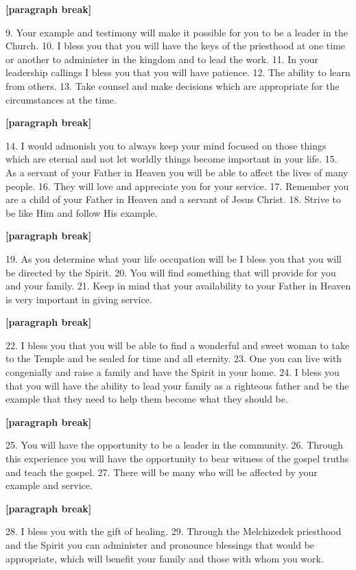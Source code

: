			\textbf{[paragraph break]}

			9. Your example and testimony will make it possible for you to be a leader in the Church.
			10. I bless you that you will have the keys of the priesthood at one time or another to administer in the kingdom and to lead the work.
			11. In your leadership callings I bless you that you will have patience.
			12. The ability to learn from others.
			13. Take counsel and make decisions which are appropriate for the circumstances at the time.

			\textbf{[paragraph break]}

			14. I would admonish you to always keep your mind focused on those things which are eternal and not let worldly things become important in your life.
			15. As a servant of your Father in Heaven you will be able to affect the lives of many people.
			16. They will love and appreciate you for your service.
			17. Remember you are a child of your Father in Heaven and a servant of Jesus Christ.
			18. Strive to be like Him and follow His example.

			\textbf{[paragraph break]}

			19. As you determine what your life occupation will be I bless you that you will be directed by the Spirit.
			20. You will find something that will provide for you and your family.
			21. Keep in mind that your availability to your Father in Heaven is very important in giving service.

			\textbf{[paragraph break]}

			22. I bless you that you will be able to find a wonderful and sweet woman to take to the Temple and be sealed for time and all eternity.
			23. One you can live with congenially and raise a family and have the Spirit in your home.
			24. I bless you that you will have the ability to lead your family as a righteous father and be the example that they need to help them become what they should be.

			\textbf{[paragraph break]}

			25. You will have the opportunity to be a leader in the community.
			26. Through this experience you will have the opportunity to bear witness of the gospel truths and teach the gospel.
			27. There will be many who will be affected by your example and service.

			\textbf{[paragraph break]}

			28. I bless you with the gift of healing.
			29. Through the Melchizedek priesthood and the Spirit you can administer and pronounce blessings that would be appropriate, which will benefit your family and those with whom you work.

